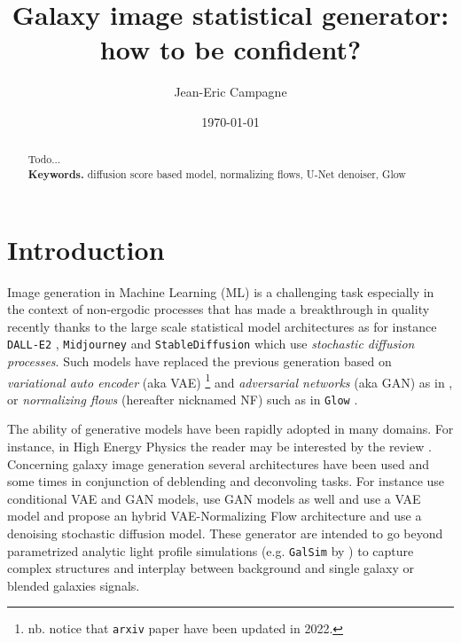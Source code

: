\documentclass[11pt]{amsart}
\title{Galaxy image statistical generator: how to be confident?}
\author{Jean-Eric Campagne}
\date{\today}
\newenvironment{nouppercase}{%
  \let\uppercase\relax%
  \renewcommand{\uppercasenonmath}[1]{}}{}
\begin{document}
\begin{nouppercase}
\maketitle
\end{nouppercase}
%
\begin{abstract}
Todo...
\\
\smallskip
\noindent \textbf{Keywords.} diffusion score based model, normalizing flows, U-Net denoiser, Glow
\end{abstract}

\section{Introduction}
\label{sec:Intro}
Image generation in Machine Learning (ML) is a challenging task especially in the context of non-ergodic processes that has made a breakthrough in quality recently thanks to the large scale statistical model architectures as for instance \texttt{DALL-E2} \citep{ramesh2022}, \texttt{Midjourney} \citep{Oppenlaender2022} and \texttt{StableDiffusion} \citep{Rombach2022} which use \textit{stochastic diffusion processes}. Such models have replaced the previous generation based on \textit{variational auto encoder} (aka VAE) \citep{Kingma2014}\footnote{nb. notice that \texttt{arxiv} paper have been updated in 2022.} and  \textit{adversarial networks} (aka GAN) \citep{goodfellow2014generative} as in \citep[e.g.]{KarrasALL18,brock2018large}, or \textit{normalizing flows} (hereafter nicknamed NF) such as in \texttt{Glow} \citep{Kingma2018}. 


The ability of generative models have been rapidly adopted in many domains. For instance, in High Energy Physics the reader may be interested by the review \cite{PhysRevD.107.076017}. Concerning galaxy image generation several architectures have been used and some times in conjunction of deblending and deconvoling tasks. For instance \cite{ravanbakhsh2016} use conditional VAE and GAN models, \citep{Schawinski2017,Fussell2019,Hemmati_2022} use GAN models as well and \citep{Arcelin2020} use a VAE model and  \cite{Lanusse2021} propose an hybrid VAE-Normalizing Flow architecture and \cite{smith2021} use a denoising stochastic diffusion model. These generator are intended to go beyond parametrized analytic light profile simulations (e.g. \texttt{GalSim} by \cite{ROWE2015121}) to capture complex structures and interplay between background and single galaxy or blended galaxies signals.  
\end{document}
